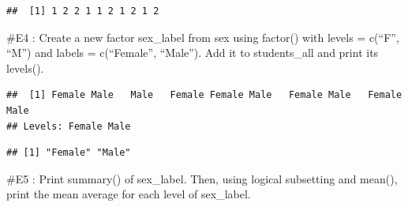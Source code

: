 \documentclass[
]{article}
\newenvironment{Shaded}{\begin{snugshade}}{\end{snugshade}}
\newcommand{\AttributeTok}[1]{\textcolor[rgb]{0.13,0.29,0.53}{#1}}
\newcommand{\FunctionTok}[1]{\textcolor[rgb]{0.13,0.29,0.53}{\textbf{#1}}}
\newcommand{\NormalTok}[1]{#1}
\newcommand{\OtherTok}[1]{\textcolor[rgb]{0.56,0.35,0.01}{#1}}
\newcommand{\SpecialCharTok}[1]{\textcolor[rgb]{0.81,0.36,0.00}{\textbf{#1}}}
\newcommand{\StringTok}[1]{\textcolor[rgb]{0.31,0.60,0.02}{#1}}
\begin{document}
\begin{verbatim}
##  [1] 1 2 2 1 1 2 1 2 1 2
\end{verbatim}

\#E4 : Create a new factor sex\_label from sex using factor() with
levels = c(``F'', ``M'') and labels = c(``Female'', ``Male''). Add it to
students\_all and print its levels().

\begin{Shaded}
\end{Shaded}

\begin{verbatim}
##  [1] Female Male   Male   Female Female Male   Female Male   Female Male  
## Levels: Female Male
\end{verbatim}

\begin{Shaded}
\end{Shaded}

\begin{verbatim}
## [1] "Female" "Male"
\end{verbatim}

\#E5 : Print summary() of sex\_label. Then, using logical subsetting and
mean(), print the mean average for each level of sex\_label.

\begin{Shaded}
\end{Shaded}
\end{document}
